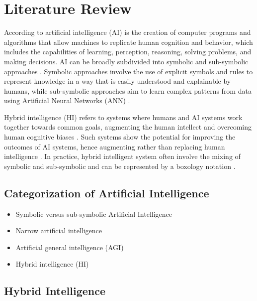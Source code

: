 \section{Literature Review}
\label{sec:literature}

According to \cite{russel2010} artificial intelligence (AI) is the creation of computer programs and algorithms
that allow machines to replicate human cognition and behavior, which includes the capabilities of learning, perception,
reasoning, solving problems, and making decisions. AI can be broadly subdivided into symbolic and sub-symbolic approaches
\citep{eliasmithSymbolicSubsymbolic2006}. Symbolic approaches involve the use of explicit symbols and rules to 
represent knowledge in a way that is easily understood and explainable by humans, while sub-symbolic approaches
aim to learn complex patterns from data using Artificial Neural Networks (ANN) \citep{ilkouSymbolicVsSubsymbolic2020}.

Hybrid intelligence (HI) refers to systems where humans and AI systems work together towards common goals, augmenting
the human intellect and overcoming human cognitive biases \citep{akataResearchAgendaHybrid2020}. Such systems show the 
potential for improving the outcomes of AI systems, hence augmenting rather than replacing human intelligence 
\cite[p. 19]{akataResearchAgendaHybrid2020}. In practice, hybrid intelligent system often involve the mixing of
symbolic and sub-symbolic and can be represented by a boxology notation \citep{harmelenBoxologyDesignPatterns2019,
vanbekkumModularDesignPatterns2021}.





\subsection{Categorization of Artificial Intelligence}

\begin{itemize}
    \item Symbolic versus sub-symbolic Artificial Intelligence
    \item Narrow artificial intelligence
    \item Artificial general intelligence (AGI)
    \item Hybrid intelligence (HI)
\end{itemize}





\subsection{Hybrid Intelligence}



